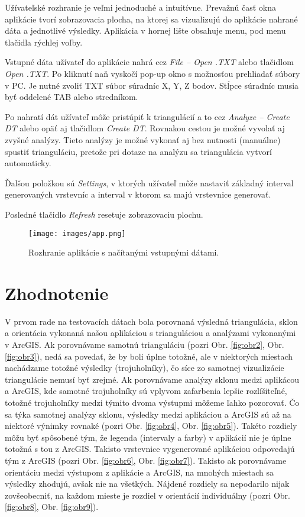 \documentclass[11pt]{article}
\begin{document}
\noindent Užívateľské rozhranie je veľmi jednoduché a intuitívne. Prevažnú časť okna aplikácie tvorí zobrazovacia plocha, na ktorej sa vizualizujú do aplikácie nahrané dáta a jednotlivé výsledky. Aplikácia v hornej lište obsahuje menu, pod menu tlačidla rýchlej voľby.

\noindent Vstupné dáta užívateľ do aplikácie nahrá cez \textit{File -- Open .TXT} alebo tlačidlom \textit{Open .TXT}. Po kliknutí naň vyskočí pop-up okno s možnosťou prehliadať súbory v PC. Je nutné zvoliť TXT súbor súradníc X, Y, Z bodov. Stĺpce súradníc musia byť oddelené TAB alebo stredníkom.

\noindent Po nahratí dát užívateľ môže pristúpiť k triangulácií a to cez \textit{Analyze -- Create DT} alebo opäť aj tlačidlom \textit{Create DT}. Rovnakou cestou je možné vyvolať aj zvyšné analýzy. Tieto analýzy je možné vykonať aj bez nutnosti (manuálne) spustiť trianguláciu, pretože pri dotaze na analýzu sa triangulácia vytvorí automaticky.

\noindent Ďalšou položkou sú \textit{Settings}, v ktorých užívateľ môže nastaviť základný interval generovaných vrstevníc a interval v ktorom sa majú vrstevnice generovať.

\noindent Posledné tlačidlo \textit{Refresh} resetuje zobrazovaciu plochu.

\begin{figure}[h]
\captionsetup{justification=centering}
\centering
\texttt{[image: images/app.png]}
\caption{Rozhranie aplikácie s načítanými vstupnými dátami.}
\label{fig:obr1}
\end{figure}


\newpage
\section{Zhodnotenie}
V prvom rade na testovacích dátach bola porovnaná výsledná triangulácia, sklon a orientácia vykonaná našou aplikáciou s trianguláciou a analýzami vykonanými v ArcGIS. Ak porovnávame samotnú trianguláciu (pozri Obr. \ref{fig:obr2}, Obr. \ref{fig:obr3}), nedá sa povedať, že by boli úplne totožné, ale v niektorých miestach nachádzame totožné výsledky (trojuholníky), čo síce zo samotnej vizualizácie triangulácie nemusí byť zrejmé. Ak porovnávame analýzy sklonu medzi aplikácou a ArcGIS, kde samotné trojuholníky sú vplyvom zafarbenia lepšie rozlíšiteľné, totožné trojuholníky medzi týmito dvoma výstupmi môžeme ľahko pozorovať. Čo sa týka samotnej analýzy sklonu, výsledky medzi aplikáciou a ArcGIS sú až na niektoré výnimky rovnaké (pozri Obr. \ref{fig:obr4}, Obr. \ref{fig:obr5}). Takéto rozdiely môžu byť spôsobené tým, že legenda (intervaly a farby) v aplikácií nie je úplne totožná s tou z ArcGIS. Takisto vrstevnice vygenerované aplikáciou odpovedajú tým z ArcGIS (pozri Obr. \ref{fig:obr6}, Obr. \ref{fig:obr7}). Takisto ak porovnávame orientáciu medzi výstupom z aplikácie a ArcGIS, na mnohých miestach sa výsledky zhodujú, avšak nie na všetkých. Nájdené rozdiely sa nepodarilo nijak zovšeobecniť, na každom mieste je rozdiel v orientácií individuálny (pozri Obr. \ref{fig:obr8}, Obr. \ref{fig:obr9}).
\end{document}
